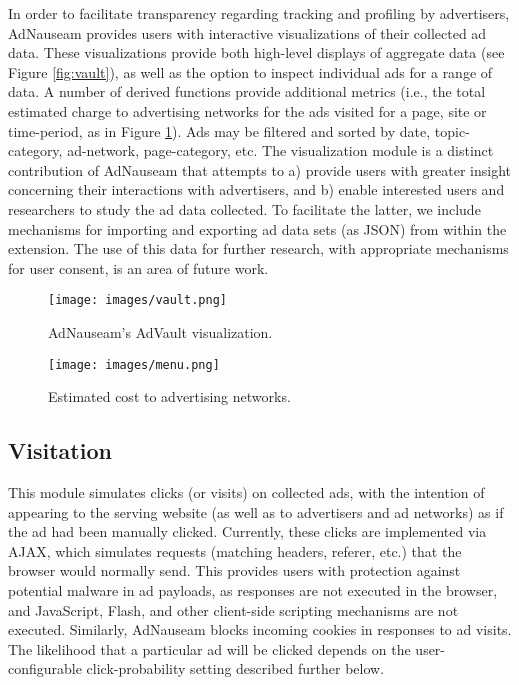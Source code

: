 \documentclass[conference]{IEEEtran}
\begin{document}
In order to facilitate transparency regarding tracking and profiling by advertisers, AdNauseam provides users with interactive visualizations of their collected ad data. These visualizations provide both high-level displays of aggregate data (see Figure \ref{fig:vault}), as well as the option to inspect individual ads for a range of data. A number of derived functions provide additional metrics (i.e., the total estimated charge to advertising networks for the ads visited for a page, site or time-period, as in Figure \ref{fig:menu}). Ads may be filtered and sorted by date, topic-category, ad-network, page-category, etc. The visualization module is a distinct contribution of AdNauseam that attempts to a) provide users with greater insight concerning their interactions with advertisers, and b) enable interested users and researchers to study the ad data collected. To facilitate the latter, we include mechanisms for importing and exporting ad data sets (as JSON) from within the extension. The use of this data for further research, with appropriate mechanisms for user consent, is an area of future work.

\begin{figure}[!t]
\centering
\texttt{[image: images/vault.png]}
\caption{AdNauseam's AdVault visualization.}
\label{fig:vault}
\vspace{2mm}
\texttt{[image: images/menu.png]}
\caption{Estimated cost to advertising networks.}
\label{fig:menu}
\end{figure}


\subsection{Visitation}

This module simulates clicks (or visits) on collected ads, with the intention of appearing to the serving website (as well as to advertisers and ad networks) as if the ad had been manually clicked. Currently, these clicks are implemented via AJAX, which simulates requests (matching headers, referer, etc.) that the browser would normally send. This provides users with protection against potential malware in ad payloads, as responses are not executed in the browser, and JavaScript, Flash, and other client-side scripting mechanisms are not executed. Similarly, AdNauseam blocks incoming cookies in responses to ad visits. The likelihood that a particular ad will be clicked depends on the user-configurable click-probability setting described further below.
\end{document}
